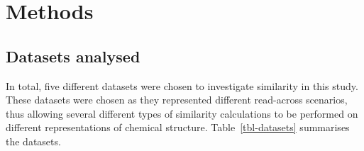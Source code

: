 \documentclass[
  super,
  preprint,
  3p]{elsarticle}
\begin{document}
\section{Methods}\label{methods}

\subsection{Datasets analysed}\label{datasets-analysed}

In total, five different datasets were chosen to investigate similarity
in this study. These datasets were chosen as they represented different
read-across scenarios, thus allowing several different types of
similarity calculations to be performed on different representations of
chemical structure. Table~\ref{tbl-datasets} summarises the datasets.
\end{document}
